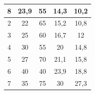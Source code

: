 \begin{table}[h!]
\begin{tabular}{|c|c|c|c|c|}
8                                                                             & 23,9                                                                        & 55                                                                       & 14,3              & 10,2                                                                                        \\ \hline
2                                                                             & 22                                                                          & 65                                                                       & 15,2              & 10,8                                                                                        \\ \hline
\rowcolor[HTML]{FFFe65}
3                                                                             & 25                                                                          & 60                                                                       & 16,7              & 12                                                                                          
\\ \hline
4                                                                             & 30                                                                          & 55                                                                       & 20                & 14,8                                                                                        \\ \hline
5                                                                             & 27                                                                          & 70                                                                       & 21,1              & 15,8                                                                                        \\ \hline
6                                                                             & 40                                                                          & 40                                                                       & 23,9              & 18,8                                                                                        \\ \hline
7                                                                             & 35                                                                          & 75                                                                       & 30                & 27,3                                                                                        \\ \hline
\end{tabular}
\end{table}

